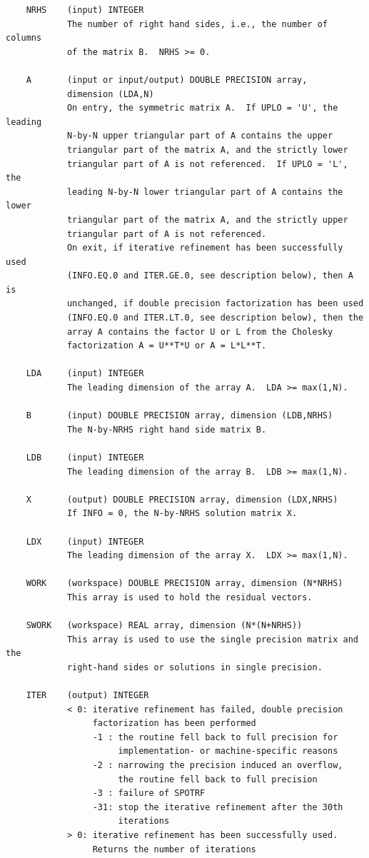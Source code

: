 \documentclass[10pt]{book}
\begin{document}
\begin{verbatim}
    NRHS    (input) INTEGER
            The number of right hand sides, i.e., the number of columns
            of the matrix B.  NRHS >= 0.

    A       (input or input/output) DOUBLE PRECISION array,
            dimension (LDA,N)
            On entry, the symmetric matrix A.  If UPLO = 'U', the leading
            N-by-N upper triangular part of A contains the upper
            triangular part of the matrix A, and the strictly lower
            triangular part of A is not referenced.  If UPLO = 'L', the
            leading N-by-N lower triangular part of A contains the lower
            triangular part of the matrix A, and the strictly upper
            triangular part of A is not referenced.
            On exit, if iterative refinement has been successfully used
            (INFO.EQ.0 and ITER.GE.0, see description below), then A is
            unchanged, if double precision factorization has been used
            (INFO.EQ.0 and ITER.LT.0, see description below), then the
            array A contains the factor U or L from the Cholesky
            factorization A = U**T*U or A = L*L**T.

    LDA     (input) INTEGER
            The leading dimension of the array A.  LDA >= max(1,N).

    B       (input) DOUBLE PRECISION array, dimension (LDB,NRHS)
            The N-by-NRHS right hand side matrix B.

    LDB     (input) INTEGER
            The leading dimension of the array B.  LDB >= max(1,N).

    X       (output) DOUBLE PRECISION array, dimension (LDX,NRHS)
            If INFO = 0, the N-by-NRHS solution matrix X.

    LDX     (input) INTEGER
            The leading dimension of the array X.  LDX >= max(1,N).

    WORK    (workspace) DOUBLE PRECISION array, dimension (N*NRHS)
            This array is used to hold the residual vectors.

    SWORK   (workspace) REAL array, dimension (N*(N+NRHS))
            This array is used to use the single precision matrix and the
            right-hand sides or solutions in single precision.

    ITER    (output) INTEGER
            < 0: iterative refinement has failed, double precision
                 factorization has been performed
                 -1 : the routine fell back to full precision for
                      implementation- or machine-specific reasons
                 -2 : narrowing the precision induced an overflow,
                      the routine fell back to full precision
                 -3 : failure of SPOTRF
                 -31: stop the iterative refinement after the 30th
                      iterations
            > 0: iterative refinement has been successfully used.
                 Returns the number of iterations


\end{verbatim}
\end{document}
